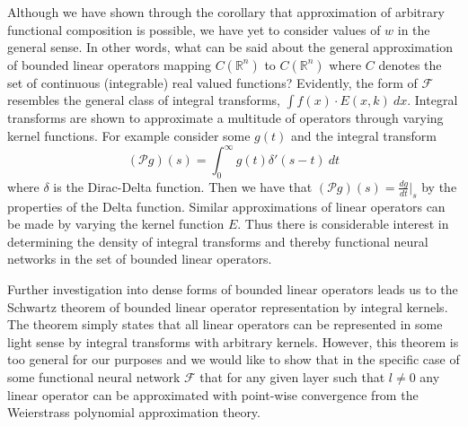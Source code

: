 Although we have shown through the corollary that approximation of arbitrary functional composition is possible, we have yet to consider values of $w$ in the general sense. In other words, what can be said about the general approximation of bounded linear operators mapping  $C(\mathbb{R}^n)$ to $C(\mathbb{R}^n)$ where $C$ denotes the set of continuous (integrable) real valued functions? Evidently, the form of $\mathcal{F}$ resembles the general class of integral transforms, $\int f(x)\cdot E(x,k)\ dx$. Integral transforms are shown to approximate a multitude of operators through varying kernel functions. For example consider some $g(t)$ and the integral transform
\begin{equation}(\mathcal{P}g)(s) = \int_0^\infty g(t)\delta'(s-t)\ dt\end{equation}
where $\delta$ is the Dirac-Delta function. Then we have that $(\mathcal{P}g)(s) = \frac{dg}{dt}\Big|_s$ by the properties of the Delta function. Similar approximations of linear operators can be made by varying the kernel function $E$. Thus there is considerable interest in determining the density of integral transforms and thereby functional neural networks in the set of bounded linear operators.


Further investigation into dense forms of bounded linear operators leads us to the Schwartz theorem of bounded linear operator representation by integral kernels. The theorem simply states that all linear operators can be represented in some light sense by integral transforms with arbitrary kernels. However, this theorem is too general for our purposes and we would like to show that in the specific case of some functional neural network $\mathcal{F}$ that for any given layer such that $l\neq 0$ any linear operator can be approximated with point-wise convergence from the Weierstrass polynomial approximation theory.

